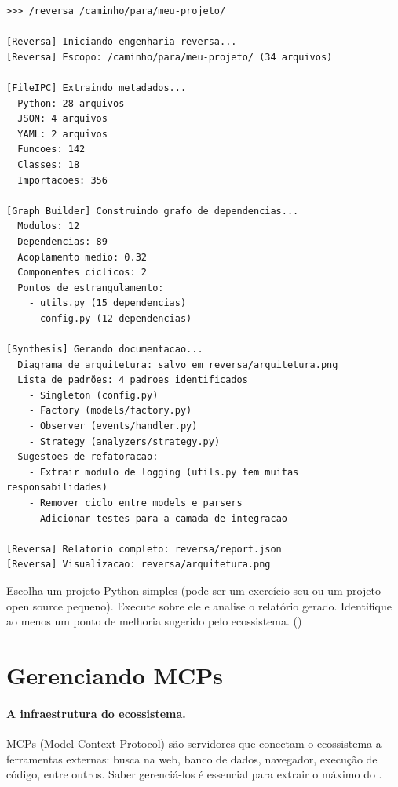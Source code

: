 \begin{lstlisting}[style=bashstyle, caption={Aplicando engenharia reversa
em um projeto Python}, label={lst:reversa}]
>>> /reversa /caminho/para/meu-projeto/

[Reversa] Iniciando engenharia reversa...
[Reversa] Escopo: /caminho/para/meu-projeto/ (34 arquivos)

[FileIPC] Extraindo metadados...
  Python: 28 arquivos
  JSON: 4 arquivos
  YAML: 2 arquivos
  Funcoes: 142
  Classes: 18
  Importacoes: 356

[Graph Builder] Construindo grafo de dependencias...
  Modulos: 12
  Dependencias: 89
  Acoplamento medio: 0.32
  Componentes ciclicos: 2
  Pontos de estrangulamento: 
    - utils.py (15 dependencias)
    - config.py (12 dependencias)

[Synthesis] Gerando documentacao...
  Diagrama de arquitetura: salvo em reversa/arquitetura.png
  Lista de padrões: 4 padroes identificados
    - Singleton (config.py)
    - Factory (models/factory.py)
    - Observer (events/handler.py)
    - Strategy (analyzers/strategy.py)
  Sugestoes de refatoracao:
    - Extrair modulo de logging (utils.py tem muitas responsabilidades)
    - Remover ciclo entre models e parsers
    - Adicionar testes para a camada de integracao

[Reversa] Relatorio completo: reversa/report.json
[Reversa] Visualizacao: reversa/arquitetura.png
\end{lstlisting}

\begin{exercicio}
Escolha um projeto Python simples (pode ser um exercício seu ou um
projeto open source pequeno). Execute  sobre ele e
analise o relatório gerado. Identifique ao menos um ponto de
melhoria sugerido pelo ecossistema. (\nivelavancado)
\end{exercicio}

\section{Gerenciando MCPs}
\label{sec:mcps}
\nivelintermediario

\paragraph{A infraestrutura do ecossistema.} MCPs (Model Context Protocol)
são servidores que conectam o ecossistema a ferramentas externas: busca na
web, banco de dados, navegador, execução de código, entre outros. Saber
gerenciá-los é essencial para extrair o máximo do \opencodeeco{}.

